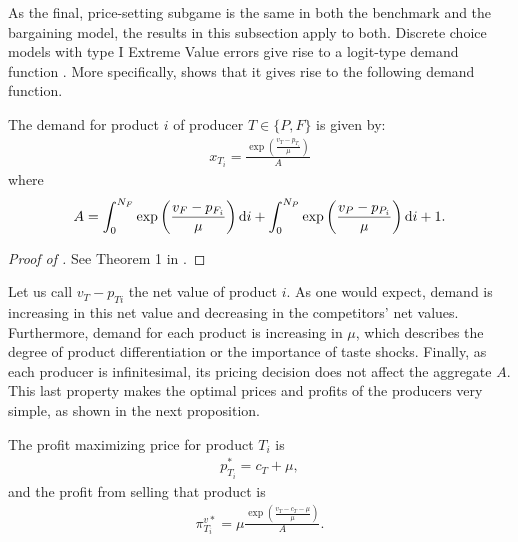 As the final, price-setting subgame is the same in both the benchmark and the bargaining model, the results in this subsection apply to both.
Discrete choice models with type I Extreme Value errors give rise to a logit-type demand function \parencite[e.g.][]{small1981applied}.
More specifically, \textcite[]{anderson2021hybrid} shows that it gives rise to the following demand function.
\begin{proposition}
    \label{prop:demand_function}
    The demand for product $i$ of producer $T \in \{P, F\}$ is given by:
    \begin{align*}
        x_{T_i} = \frac{\exp\left( \frac{v_T - p_{T_i}}{\mu} \right)}{A}
    \end{align*}
    where
    \begin{align}
        A = \int_0^{N_F} \exp\left( \frac{v_F - p_{F_i}}{\mu} \right) \mathrm{d}i + \int_0^{N_P} \exp\left( \frac{v_P - p_{P_i}}{\mu} \right) \mathrm{d}i + 1.
        \label{eq:aggregate}
    \end{align}
\end{proposition}
\begin{proof}[Proof of ]
    See Theorem 1 in \textcite{anderson2021hybrid}.
\end{proof}

Let us call $v_T - p_{Ti}$ the net value of product $i$.
As one would expect, demand is increasing in this net value and decreasing in the competitors' net values.
Furthermore, demand for each product is increasing in $\mu$, which describes the degree of product differentiation or the importance of taste shocks.
Finally, as each producer is infinitesimal, its pricing decision does not affect the aggregate $A$.
This last property makes the optimal prices and profits of the producers very simple, as shown in the next proposition.
\begin{proposition}
    \label{prop:optimal_profit}
    The profit maximizing price for product $T_i$ is
    \begin{align*}
        p^*_{T_i} = c_T + \mu,
    \end{align*}
    and the profit from selling that product is
    \begin{align}
        \pi^{v*}_{T_i} = \mu \frac{\exp \left( \frac{v_T - c_T - \mu}{\mu} \right)}{A}.
        \label{eq:optimal_profit}
    \end{align}
\end{proposition}

